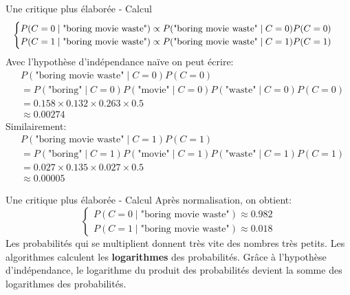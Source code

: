 \documentclass[10pt]{beamer}  %
\begin{document}
\begin{frame}{Une critique plus élaborée - Calcul}
	\begin{equation}
		\resizebox{1.0\textwidth}{!}{%
			$\begin{cases}
				P(C = 0 \mid \text{"boring movie waste"}) \propto P(\text{"boring movie waste"} \mid C = 0) P(C=0) \\
				P(C = 1 \mid \text{"boring movie waste"}) \propto P(\text{"boring movie waste"} \mid C = 1) P(C=1)
			\end{cases}$
		}
		\nonumber
	\end{equation}
	\pause
	Avec l'hypothèse d'indépendance naïve on peut écrire:
	\begin{equation}
		\begin{aligned}
			&P(\text{"boring movie waste"} \mid C = 0) P(C=0) \\
			&= P(\text{"boring"} \mid C = 0) P(\text{"movie"} \mid C = 0) P(\text{"waste"} \mid C = 0) P(C=0) \\
			&= 0.158 \times 0.132 \times 0.263 \times 0.5 \\
			&\approx 0.00274 
		\end{aligned}
		\nonumber
	\end{equation}
	\pause
	Similairement:
	\begin{equation}
		\begin{aligned}
			&P(\text{"boring movie waste"} \mid C = 1) P(C=1) \\
			&= P(\text{"boring"} \mid C = 1) P(\text{"movie"} \mid C = 1) P(\text{"waste"} \mid C = 1) P(C=1) \\
			&= 0.027 \times 0.135 \times 0.027 \times 0.5 \\
			&\approx 0.00005
		\end{aligned}
		\nonumber
	\end{equation}
\end{frame}

\begin{frame}{Une critique plus élaborée - Calcul}
	Après normalisation, on obtient:
	\begin{equation}
		\begin{cases}
			P(C = 0 \mid \text{"boring movie waste"}) \approx 0.982 \\
			P(C = 1 \mid \text{"boring movie waste"}) \approx 0.018
		\end{cases}
		\nonumber
	\end{equation}
	\pause
	Les probabilités qui se multiplient donnent très vite des nombres très petits. Les algorithmes calculent les \textbf{logarithmes} des probabilités. Grâce à l'hypothèse d'indépendance, le logarithme du produit des probabilités devient la somme des logarithmes des probabilités.
\end{frame}
\end{document}
